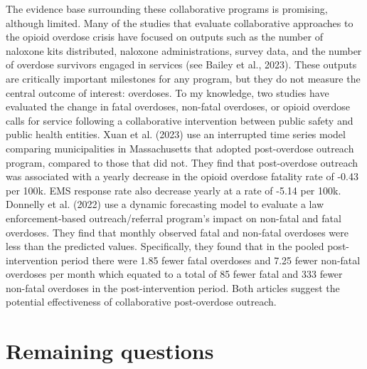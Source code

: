 The evidence base surrounding these collaborative programs is promising, although limited. Many of the studies that evaluate collaborative approaches to the opioid overdose crisis have focused on outputs such as the number of naloxone kits distributed, naloxone administrations, survey data, and the number of overdose survivors engaged in services (see Bailey et al., 2023). These outputs are critically important milestones for any program, but they do not measure the central outcome of interest: overdoses. To my knowledge, two studies have evaluated the change in fatal overdoses, non-fatal overdoses, or opioid overdose calls for service following a collaborative intervention between public safety and public health entities. Xuan et al. (2023) use an interrupted time series model comparing municipalities in Massachusetts that adopted post-overdose outreach program, compared to those that did not. They find that post-overdose outreach was associated with a yearly decrease in the opioid overdose fatality rate of -0.43 per 100k. EMS response rate also decrease yearly at a rate of -5.14 per 100k. Donnelly et al. (2022) use a dynamic forecasting model to evaluate a law enforcement-based outreach/referral program’s impact on non-fatal and fatal overdoses. They find that monthly observed fatal and non-fatal overdoses were less than the predicted values. Specifically, they found that in the pooled post-intervention period there were 1.85 fewer fatal overdoses and 7.25 fewer non-fatal overdoses per month which equated to a total of 85 fewer fatal and 333 fewer non-fatal overdoses in the post-intervention period. Both articles suggest the potential effectiveness of collaborative post-overdose outreach.

\section{Remaining questions}
	
